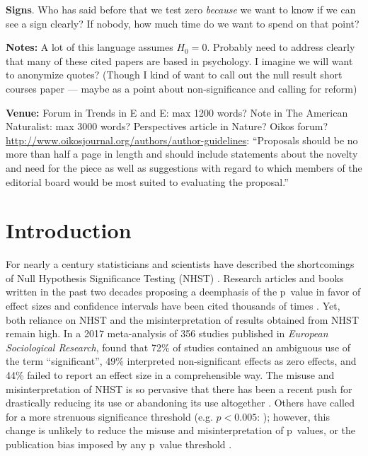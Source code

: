 \textbf{Signs}. Who has said before that we test zero \emph{because} we want to know if we can see a sign clearly? If nobody, how much time do we want to spend on that point?

\textbf{Notes:} A lot of this language assumes $H_{0} = 0$. Probably need to address clearly that many of these cited
papers are based in psychology. I imagine we will want to anonymize quotes? (Though I kind of want to call out the null
result short courses paper --- maybe as a point about non-significance and calling for reform)

\textbf{Venue:} Forum in Trends in E and E: max 1200 words?
Note in The American Naturalist: max 3000 words? Perspectives article in Nature?
Oikos forum? \url{http://www.oikosjournal.org/authors/author-guidelines}: ``Proposals should be no more than half a page in length and should include statements about the novelty and need for the piece as well as suggestions with regard to which members of the editorial board would be most suited to evaluating the proposal.''

\clearpage

\section*{Introduction}

For nearly a century statisticians and scientists have described the shortcomings of Null Hypothesis Significance Testing
(NHST) \citep[see][]{Cohen1994}. Research articles and books written in the past two decades proposing a deemphasis of the 
p~value in favor of effect sizes and confidence intervals have been cited thousands of times \citep{Cohen1994, Goodman1999, 
Wilkinson1999, ZiliakandMcCloskey2008, WassersteinandLazar2016}. Yet, both reliance on NHST and the misinterpretation of 
results obtained from NHST remain high. In a 2017 meta-analysis of 356 studies published in \emph{European Sociological 
Research}, \citet{Bernardietal.2017} found that 72\% of studies contained an ambiguous use of the term ``significant'', 
49\% interpreted non-significant effects as zero effects, and 44\% failed to report an effect size in a comprehensible 
way. The misuse and misinterpretation of NHST is so pervasive that there has been a recent push for drastically reducing its 
use \citep{SzucsandIoannidis2017} or abandoning its use altogether \citep{McShaneetal.2017}. Others have called for a more
strenuous significance threshold (e.g. $p < 0.005$: \citealt{Benjaminetal.2018}); however, this change is unlikely to reduce
the misuse and misinterpretation of p~values, or the publication bias imposed by any p~value threshold \citep{Ridleyetal.2007}.

